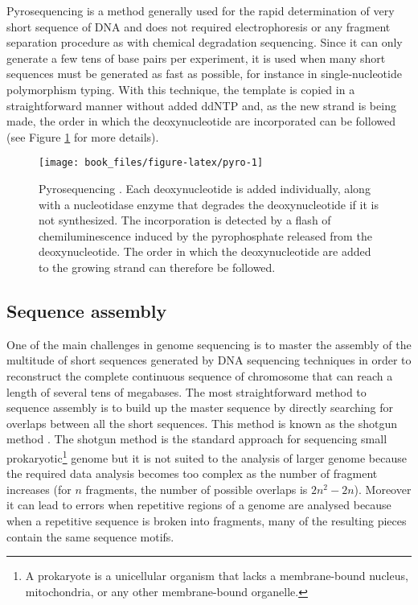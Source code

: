 \documentclass[]{book}
\begin{document}
Pyrosequencing is a method generally used for the rapid determination of
very short sequence of DNA and does not required electrophoresis or any
fragment separation procedure as with chemical degradation sequencing.
Since it can only generate a few tens of base pairs per experiment, it
is used when many short sequences must be generated as fast as possible,
for instance in single-nucleotide polymorphism typing. With this
technique, the template is copied in a straightforward manner without
added ddNTP and, as the new strand is being made, the order in which the
deoxynucleotide are incorporated can be followed (see Figure
\ref{fig:pyro} for more details).



\begin{figure}

{\centering \texttt{[image: book\_files/figure-latex/pyro-1]} 

}

\caption{Pyrosequencing \citep{brown2007genomes}. Each deoxynucleotide is added individually, along with a nucleotidase enzyme that degrades the deoxynucleotide if it is not synthesized. The incorporation is detected by a flash of chemiluminescence induced by the pyrophosphate released from the deoxynucleotide. The order in which the deoxynucleotide are added to the growing strand can therefore be followed.}\label{fig:pyro}
\end{figure}

\hypertarget{sequence-assembly}{%
\subsection{Sequence assembly}\label{sequence-assembly}}

One of the main challenges in genome sequencing is to master the
assembly of the multitude of short sequences generated by DNA sequencing
techniques in order to reconstruct the complete continuous sequence of
chromosome that can reach a length of several tens of megabases. The
most straightforward method to sequence assembly is to build up the
master sequence by directly searching for overlaps between all the short
sequences. This method is known as the shotgun method
\citep{anderson1981shotgun}. The shotgun method is the standard approach for
sequencing small prokaryotic\footnote{A prokaryote is a unicellular organism that lacks a membrane-bound
  nucleus, mitochondria, or any other membrane-bound organelle.} genome but it is not suited to the
analysis of larger genome because the required data analysis becomes too
complex as the number of fragment increases (for \(n\) fragments, the
number of possible overlaps is \(2n^2 - 2n\)). Moreover it can lead to
errors when repetitive regions of a genome are analysed because when a
repetitive sequence is broken into fragments, many of the resulting
pieces contain the same sequence motifs.
\end{document}
